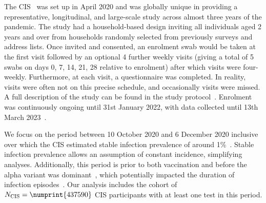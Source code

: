 \documentclass[12pt]{article}
\makeatletter
\newcommand{\Ncis}{N_\text{CIS}}
\DeclareRobustCommand\onedot{\futurelet\@let@token\@onedot}
\def\@onedot{\ifx\@let@token.\else.\null\fi\xspace}
\def\eg{e.g\onedot} \def\Eg{{E.g}\onedot}
\makeatother
\begin{document}
The CIS~\citep{CIS} was set up in April 2020 and was globally unique in providing a representative, longitudinal, and large-scale study across almost three years of the pandemic.
The study had a household-based design inviting all individuals aged 2 years and over from households randomly selected from previously surveys and address lists.
Once invited and consented, an enrolment swab would be taken at the first visit followed by an optional 4 further weekly visits (giving a total of 5 swabs on days 0, 7, 14, 21, 28 relative to enrolment) after which visits were four-weekly. Furthermore, at each visit, a questionnaire was completed.  In reality, visits were often not on this precise schedule, and occasionally visits were missed. %
A full description of the study can be found in the study protocol~\citep{cisProtocol}.
Enrolment was continuously ongoing until 31st January 2022, with data collected until 13th March 2023~\citep{weiRisk}. 

We focus on the period between 10 October 2020 and 6 December 2020 inclusive over which the CIS estimated stable infection prevalence of around 1\%~\citep{onsCISdec2020}.
Stable infection prevalence allows an assumption of constant incidence, simplifying analyses.
Additionally, this period is prior to both vaccination and before the alpha variant was dominant~\citep{lythgoeLineage}, which potentially impacted the duration of infection episodes~\citep{hakkiOnset,russellWithinhost}.
Our analysis includes the cohort of $\Ncis = \numprint{437590}$ CIS participants with at least one test in this period.

\end{document}
